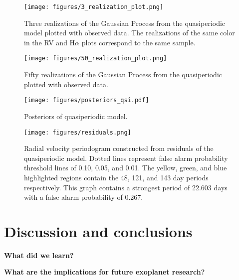 \documentclass{aastex6}
\begin{document}
\begin{figure} \label{fig:qsireal}
    \begin{center}
    \texttt{[image: figures/3\_realization\_plot.png]}
    \caption{Three realizations of the Gaussian Process from the quasiperiodic model plotted with observed data. The realizations of the same color in the RV and H$\alpha$ plots correspond to the same sample.}   
    \end{center}
\end{figure}
\begin{figure} \label{fig:qsireal}
    \begin{center}
    \texttt{[image: figures/50\_realization\_plot.png]}
    \caption{Fifty realizations of the Gaussian Process from the quasiperiodic plotted with observed data.}   
    \end{center}
\end{figure}

\begin{figure} \label{fig:qsipost}
    \begin{center}
    \texttt{[image: figures/posteriors\_qsi.pdf]}
    \caption{Posteriors of quasiperiodic model.}
     \end{center}
\end{figure}

\begin{figure} \label{fig:qsipdgm}
    \begin{center}
    \texttt{[image: figures/residuals.png]}
    \caption{Radial velocity periodogram constructed from residuals of the quasiperiodic model. Dotted lines represent false alarm probability threshold lines of 0.10, 0.05, and 0.01. The yellow, green, and blue highlighted regions contain the 48, 121, and 143 day periods respectively. This graph contains a strongest period of 22.603 days with a false alarm probability of 0.267.}
    \end{center}
\end{figure}




\section{Discussion and conclusions}\label{sec:disc}

\textbf{What did we learn?}

\textbf{What are the implications for future exoplanet research?}\\
\end{document}
